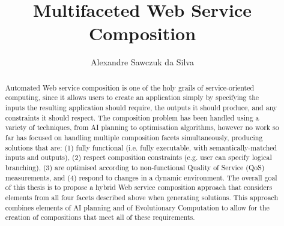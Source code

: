 \documentclass[11pt
              , a4paper
              , twoside
              , openright
              ]{report}
\title{Multifaceted Web Service Composition}
\author{Alexandre Sawczuk da Silva}
\begin{document}
\frontmatter



\begin{abstract}

Automated Web service composition is one of the holy grails of service-orient\-ed computing, since it allows users to create an application simply by specifying the inputs the resulting application should require, the outputs it should produce, and any constraints it should respect. The composition problem has been handled using a variety of techniques, from AI planning to optimisation algorithms, however no work so far has focused on handling multiple composition facets simultaneously, producing solutions that are: (1) fully functional (i.e. fully executable, with semantically-matched inputs and outputs), (2) respect composition constraints (e.g. user can specify logical branching), (3) are optimised according to non-functional Quality of Service (QoS) measurements, and (4) respond to changes in a dynamic environment. The overall goal of this thesis is to propose a hybrid Web service composition approach that considers elements from all four facets described above when generating solutions. This approach combines elements of AI planning and of Evolutionary Computation to allow for the creation of compositions that meet all of these requirements.

\end{abstract}


\maketitle

%

\tableofcontents



\mainmatter








\backmatter



%


\end{document}
